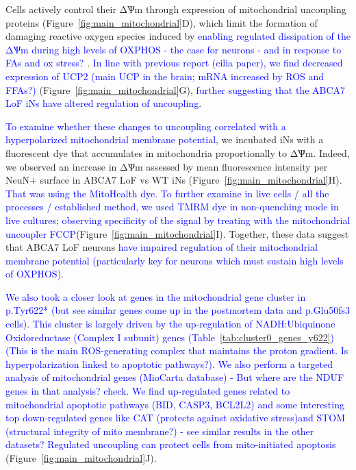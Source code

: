 Cells actively control their ΔѰm through expression of mitochondrial uncoupling proteins\cite{noauthor_2021-tx,noauthor_2021-im} (Figure~\ref{fig:main_mitochondrial}D), which limit the formation of damaging reactive oxygen species induced by \textcolor{blue}{enabling regulated dissipation of the ΔѰm during high levels of OXPHOS - the case for neurons - and in response to FAs and ox stress?} \cite{Suski2012-zo}. \textcolor{blue}{In line with previous report (cilia paper), we find decreased expression of UCP2 (main UCP in the brain; mRNA increased by ROS and FFAs?)} (Figure~\ref{fig:main_mitochondrial}G), \textcolor{blue}{further suggesting that the ABCA7 LoF iNs have altered regulation of uncoupling}. 

\textcolor{blue}{To examine whether these changes to uncoupling correlated with a hyperpolarized mitochondrial membrane potential}, we incubated iNs with a fluorescent dye that accumulates in mitochondria proportionally to ΔѰm. Indeed, we observed an increase in ΔѰm assessed by mean fluorescence intensity per NeuN+ surface in ABCA7 LoF vs WT iNs (Figure~\ref{fig:main_mitochondrial}H). \textcolor{blue}{That was using the MitoHealth dye. To further examine in live cells / all the processes / established method, we used TMRM dye in non-quenching mode in live cultures; observing specificity of the signal by treating with the mitochondrial uncoupler FCCP}(Figure~\ref{fig:main_mitochondrial}I). Together, these data suggest that ABCA7 LoF neurons \textcolor{blue}{have impaired regulation of their mitochondrial membrane potential (particularly key for neurons which must sustain high levels of OXPHOS)}. 



\textcolor{blue}{We also took a closer look at genes in the mitochondrial gene cluster in p.Tyr622* (but see similar genes come up in the postmortem data and p.Glu50fs3 cells). This cluster is largely driven by the up-regulation of NADH:Ubiquinone Oxidoreductase (Complex I subunit) genes (Table~\ref{tab:cluster0_genes_y622}) (This is the main ROS-generating complex that maintains the proton gradient. Is hyperpolarization linked to apoptotic pathways?). We also perform a targeted analysis of mitochondrial genes (MioCarta database) - But where are the NDUF genes in that analysis? check. We find up-regulated genes related to mitochondrial apoptotic pathways (BID, CASP3, BCL2L2) and some interesting top down-regulated genes like CAT (protects against oxidative stress)and STOM (structural integrity of mito membrane?) - see similar results in the other datasets? Regulated uncoupling can protect cells from mito-initiated apoptosis} (Figure~\ref{fig:main_mitochondrial}J).

